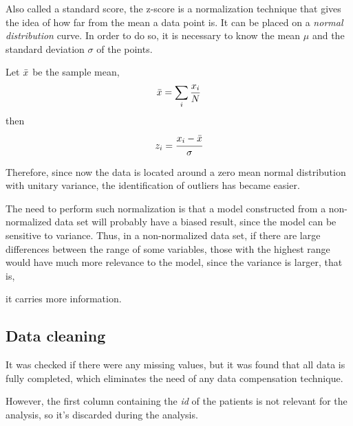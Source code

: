 \documentclass[conference]{IEEEtran}
\begin{document}
Also called a standard score, the z-score is a normalization technique that gives the 
idea of how far from the mean a data point is. It can be placed on a 
\textit{normal distribution} curve. In order to do so, it is necessary to know the 
mean $\mu$ and the standard deviation $\sigma$ of the points.

Let $\Bar{x}$ be the sample mean,
$$\Bar{x} = \sum_i \frac{x_i}{N}$$
then
$$z_i = \cfrac{x_i - \Bar{x}}{\sigma}$$

Therefore, since now the data is located around a zero mean normal distribution with 
unitary variance, the identification of outliers has became easier.

The need to perform such normalization is that a model constructed from a 
non-normalized data set will probably have a biased result, since the model can be 
sensitive to variance. Thus, in a non-normalized data set, if there are large 
differences between the range of some variables, those with the highest range would 
have much more relevance to the model, since the variance is larger, that is, 

it carries more information.

\subsection{Data cleaning}\label{AA}
It was checked if there were any missing values, but it was found that all data is fully completed, 
which eliminates the need of any data compensation technique.

However, the first column containing the \textit{id} of the patients is not relevant for the analysis, so it's discarded during the analysis.
\end{document}
